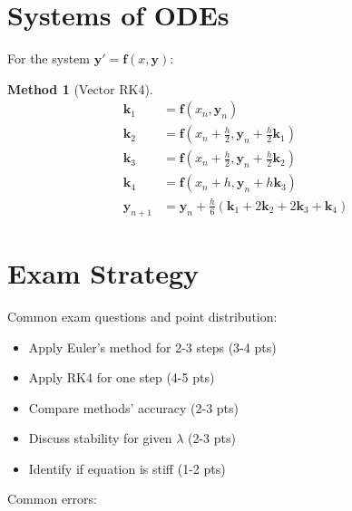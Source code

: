 \documentclass[12pt]{article}
\newtheorem{method}{Method}
\begin{document}
\section{Systems of ODEs}

For the system $\mathbf{y}' = \mathbf{f}(x, \mathbf{y})$:

\begin{method}[Vector RK4]
\begin{align}
\mathbf{k}_{1} &= \mathbf{f}(x_{n}, \mathbf{y}_{n}) \\
\mathbf{k}_{2} &= \mathbf{f}(x_{n} + \frac{h}{2}, \mathbf{y}_{n} + \frac{h}{2}\mathbf{k}_{1}) \\
\mathbf{k}_{3} &= \mathbf{f}(x_{n} + \frac{h}{2}, \mathbf{y}_{n} + \frac{h}{2}\mathbf{k}_{2}) \\
\mathbf{k}_{4} &= \mathbf{f}(x_{n} + h, \mathbf{y}_{n} + h\mathbf{k}_{3}) \\
\mathbf{y}_{n+1} &= \mathbf{y}_{n} + \frac{h}{6}(\mathbf{k}_{1} + 2\mathbf{k}_{2} + 2\mathbf{k}_{3} + \mathbf{k}_{4})
\end{align}
\end{method}

\section{Exam Strategy}

\begin{examtip}
Common exam questions and point distribution:
\begin{itemize}
\item Apply Euler's method for 2-3 steps (3-4 pts)
\item Apply RK4 for one step (4-5 pts)
\item Compare methods' accuracy (2-3 pts)
\item Discuss stability for given $\lambda$ (2-3 pts)
\item Identify if equation is stiff (1-2 pts)
\end{itemize}
\end{examtip}

\begin{warning}
Common errors:
\end{warning}
\end{document}
